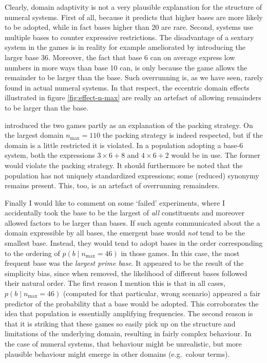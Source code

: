 \documentclass{../src/bcthesispart}
\begin{document}
Clearly, domain adaptivity is not a very plausible explanation for the structure of numeral systems.
First of all, because it predicts that higher bases are more likely to be adopted, while in fact bases higher than 20 are rare.
Second, systems use multiple bases to counter expressive restrictions.
The disadvantage of a sextary system in the games is in reality for example ameliorated by introducing the larger base 36.
Moreover, the fact that base 6 can on average express low numbers in more ways than base 10 can, is only because the game allows the remainder to be larger than the base. 
Such overrunning is, as we have seen, rarely found in actual numeral systems.
In that respect, the eccentric domain effects illustrated in figure \ref{fig:effect-n-max} are really an artefact of allowing remainders to be larger than the base.

\textcite{Hurford1987} introduced the two games partly as an explanation of the packing strategy.
On the largest domain $n_{\text{max}} = 110$ the packing strategy is indeed respected, but if the domain is a little restricted it is violated.
In a population adopting a base-6 system, both the expressions $3\times 6 + 8$ and $4 \times 6 + 2$ would be in use. 
The former would violate the packing strategy. 
It should furthermore be noted that the population has not uniquely standardized expressions; some (reduced) synonymy remains present.
This, too, is an artefact of overrunning remainders.


Finally I would like to comment on some ‘failed’ experiments, where I accidentally took the base to be the largest of \emph{all} constituents and moreover allowed factors to be larger than bases.
If such agents communicated about the a domain expressible by all bases, the emergent base would \emph{not} tend to be the smallest base.
Instead, they would tend to adopt bases in the order corresponding to the ordering of  $p(b \mid n_{\text{max}} = 46)$ in those games.
In this case, the most frequent base was the \emph{largest prime base}.
It appeared to be the result of the simplicity bias, since when removed, the likelihood of different bases followed their natural order.
The first reason I mention this is that in all cases, $p(b \mid n_{\text{max}} = 46)$ (computed for that particular, wrong scenario) appeared a fair predictor of the probability that a base would be adopted.
This corroborates the idea that population is essentially amplifying frequencies.
The second reason is that it is striking that these games so easily pick up on the structure and limitations of the underlying domain, resulting in fairly complex behaviour.
In the case of numeral systems, that behaviour might be unrealistic, but more plausible behaviour might emerge in other domains (e.g.~colour terms).
\end{document}
